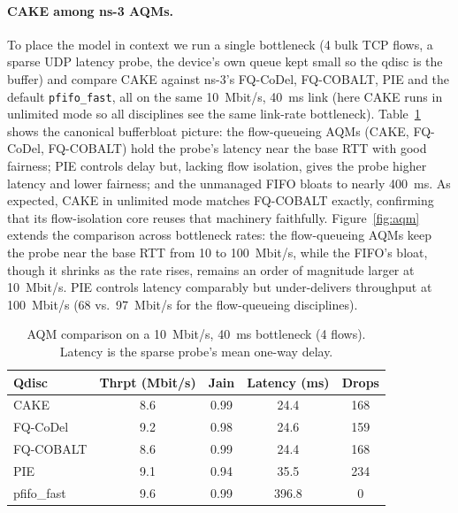\documentclass[sigconf,nonacm]{acmart}
\begin{document}
\paragraph{CAKE among ns-3 AQMs.} To place the model in context we run a single
bottleneck (4 bulk TCP flows, a sparse UDP latency probe, the device's own queue
kept small so the qdisc is the buffer) and compare CAKE against ns-3's
FQ-CoDel, FQ-COBALT, PIE and the default \texttt{pfifo\_fast}, all on the same
10~Mbit/s, 40~ms link (here CAKE runs in unlimited mode so all disciplines see
the same link-rate bottleneck). Table~\ref{tab:aqm} shows the canonical
bufferbloat picture: the flow-queueing AQMs (CAKE, FQ-CoDel, FQ-COBALT) hold the
probe's latency near the base RTT with good fairness; PIE controls delay but,
lacking flow isolation, gives the probe higher latency and lower fairness; and
the unmanaged FIFO bloats to nearly 400~ms. As expected, CAKE in unlimited mode
matches FQ-COBALT exactly, confirming that its flow-isolation core reuses that
machinery faithfully. Figure~\ref{fig:aqm} extends the comparison across
bottleneck rates: the flow-queueing AQMs keep the probe near the base RTT from
10 to 100~Mbit/s, while the FIFO's bloat, though it shrinks as the rate rises,
remains an order of magnitude larger at 10~Mbit/s. PIE controls latency
comparably but under-delivers throughput at 100~Mbit/s (68 vs.\ 97~Mbit/s for
the flow-queueing disciplines).

\begin{table}[t]
\caption{AQM comparison on a 10~Mbit/s, 40~ms bottleneck (4 flows). Latency is
the sparse probe's mean one-way delay.}
\label{tab:aqm}
\small
\begin{tabular}{@{}lcccc@{}}
\toprule
Qdisc & Thrpt (Mbit/s) & Jain & Latency (ms) & Drops\\
\midrule
CAKE        & 8.6 & 0.99 & 24.4  & 168\\
FQ-CoDel    & 9.2 & 0.98 & 24.6  & 159\\
FQ-COBALT   & 8.6 & 0.99 & 24.4  & 168\\
PIE         & 9.1 & 0.94 & 35.5  & 234\\
pfifo\_fast & 9.6 & 0.99 & 396.8 & 0\\
\bottomrule
\end{tabular}
\end{table}
\end{document}
